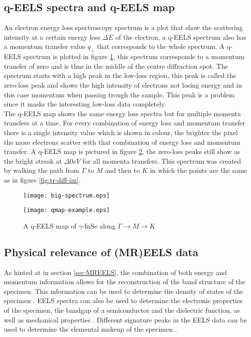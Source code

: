 \subsection{q-EELS spectra and q-EELS map}
An electron energy loss spectroscopy spectrum is a plot that show the scattering intensity at a certain energy loss $\Delta E$ of the electron, a q-EELS spectrum also has a momentum transfer value $q_{\perp}$ that corresponds to the whole spectrum. A q-EELS spectrum is plotted in figure \ref{fig:spectrum}, this spectrum corresponds to a momentum transfer of zero and is thus in the middle of the centre diffraction spot. The spectrum starts with a high peak in the low-loss region, this peak is called the zero-loss peak and shows the high intensity of electrons not losing energy and in this case momentum when passing trough the sample. This peak is a problem since it masks the interesting low-loss data completely.\\
The q-EELS map shows the same energy loss spectra but for multiple momenta transfers at a time. For every combination of energy loss and momentum transfer there is a single intensity value which is shown in colour, the brighter the pixel the more electrons scatter with that combination of energy loss and momentum transfer. A q-EELS map is pictured in figure \ref{fig:qmap}, the zero-loss peaks still show as the bright streak at $\Delta 0 eV$ for all momenta transfers. This spectrum was created by walking the path from $\Gamma$ to $M$ and then to $K$ in which the points are the same as in figure \ref{fig:tr-diff-im}.
%
\begin{figure}[H]
	\centering
	\captionsetup{width=0.9\linewidth}
	\texttt{[image: big-spectrum.eps]}
	\label{fig:spectrum}
\end{figure}
%
\begin{figure}[H]
	\centering
	\captionsetup{width=0.9\linewidth}
	\texttt{[image: qmap-example.eps]}
	\caption{A q-EELS map of $\gamma$-InSe along $\Gamma \rightarrow M \rightarrow K$}
	\label{fig:qmap}
\end{figure}
%
\subsection{Physical relevance of (MR)EELS data}
As hinted at in section \ref{sec:MREELS}, the combination of both energy and momentum information allows for the reconstruction of the band structure of the specimen. This information can be used to determine the density of states of the specimen \cite{doi:10.1021/acs.nanolett.9b03928} \cite{Egerton_2008}.
EELS spectra can also be used to determine the electronic properties of the specimen, the bandgap of a semiconductor and the dielectric function, as well as mechanical properties \cite{Egerton_2008}.
Different signature peaks in the EELS data can be used to determine the elemental makeup of the specimen \cite{Egerton_2008}.
